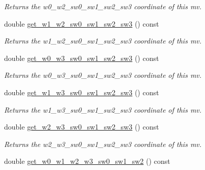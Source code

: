\begin{DoxyCompactItemize}
\begin{DoxyCompactList}\small\item\em Returns the w0\-\_\-w2\-\_\-sw0\-\_\-sw1\-\_\-sw2\-\_\-sw3 coordinate of this mv. \end{DoxyCompactList}\item 
\hypertarget{classe3ga_1_1mv_ad6ed503469ab19f0a5edb7a6213a912e}{double \hyperlink{classe3ga_1_1mv_ad6ed503469ab19f0a5edb7a6213a912e}{get\-\_\-w1\-\_\-w2\-\_\-sw0\-\_\-sw1\-\_\-sw2\-\_\-sw3} () const }\label{classe3ga_1_1mv_ad6ed503469ab19f0a5edb7a6213a912e}

\begin{DoxyCompactList}\small\item\em Returns the w1\-\_\-w2\-\_\-sw0\-\_\-sw1\-\_\-sw2\-\_\-sw3 coordinate of this mv. \end{DoxyCompactList}\item 
\hypertarget{classe3ga_1_1mv_ae947a34acaa384130e1c46e85513c182}{double \hyperlink{classe3ga_1_1mv_ae947a34acaa384130e1c46e85513c182}{get\-\_\-w0\-\_\-w3\-\_\-sw0\-\_\-sw1\-\_\-sw2\-\_\-sw3} () const }\label{classe3ga_1_1mv_ae947a34acaa384130e1c46e85513c182}

\begin{DoxyCompactList}\small\item\em Returns the w0\-\_\-w3\-\_\-sw0\-\_\-sw1\-\_\-sw2\-\_\-sw3 coordinate of this mv. \end{DoxyCompactList}\item 
\hypertarget{classe3ga_1_1mv_aada497bb2242b5bded2ce180c1c80f1e}{double \hyperlink{classe3ga_1_1mv_aada497bb2242b5bded2ce180c1c80f1e}{get\-\_\-w1\-\_\-w3\-\_\-sw0\-\_\-sw1\-\_\-sw2\-\_\-sw3} () const }\label{classe3ga_1_1mv_aada497bb2242b5bded2ce180c1c80f1e}

\begin{DoxyCompactList}\small\item\em Returns the w1\-\_\-w3\-\_\-sw0\-\_\-sw1\-\_\-sw2\-\_\-sw3 coordinate of this mv. \end{DoxyCompactList}\item 
\hypertarget{classe3ga_1_1mv_af9483de96b49f7460725fe2eed57c4d4}{double \hyperlink{classe3ga_1_1mv_af9483de96b49f7460725fe2eed57c4d4}{get\-\_\-w2\-\_\-w3\-\_\-sw0\-\_\-sw1\-\_\-sw2\-\_\-sw3} () const }\label{classe3ga_1_1mv_af9483de96b49f7460725fe2eed57c4d4}

\begin{DoxyCompactList}\small\item\em Returns the w2\-\_\-w3\-\_\-sw0\-\_\-sw1\-\_\-sw2\-\_\-sw3 coordinate of this mv. \end{DoxyCompactList}\item 
\hypertarget{classe3ga_1_1mv_aab7111b455bf97515e102e5e523d41f0}{double \hyperlink{classe3ga_1_1mv_aab7111b455bf97515e102e5e523d41f0}{get\-\_\-w0\-\_\-w1\-\_\-w2\-\_\-w3\-\_\-sw0\-\_\-sw1\-\_\-sw2} () const }\label{classe3ga_1_1mv_aab7111b455bf97515e102e5e523d41f0}


\end{DoxyCompactItemize}
